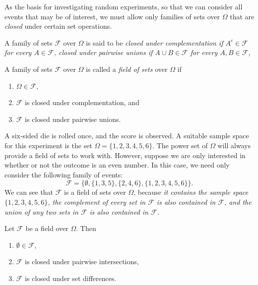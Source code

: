 \smallskip
As the basis for investigating random experiments, so that we can consider all events that may be of interest, we must allow only families of sets over $\Omega$ that are \emph{closed} under certain set operations.

\begin{definition}
A family of sets $\mathcal{F}$ over $\Omega$ is said to be
\ben
\it \emph{closed under complementation} if $A^c\in\mathcal{F}$ for every $A\in\mathcal{F}$, 
\it \emph{closed under pairwise unions} if $A\cup B\in\mathcal{F}$ for every $A,B\in\mathcal{F}$, 
\een
\end{definition}

\begin{definition}
A family of sets $\mathcal{F}$ over $\Omega$ is called a \emph{field of sets} over $\Omega$ if
\begin{enumerate}
\item $\Omega\in\mathcal{F}$,
\item $\mathcal{F}$ is closed under complementation, and
\item $\mathcal{F}$ is closed under pairwise unions.
\end{enumerate}
\end{definition}

\begin{example}\label{ex:fields_of_sets}
A six-sided die is rolled once, and the score is observed. A suitable sample space for this experiment is the set 
$\Omega=\{1,2,3,4,5,6\}$. The power set of $\Omega$ will always provide a field of sets to work with. However, suppose we are only interested in whether or not the outcome is an even number. In this case, we need only consider the following family of events:
\[
\mathcal{F} = \big\{\emptyset, \{1,3,5\}, \{2,4,6\}, \{1,2,3,4,5,6\}\big\}.
\]
We can see that $\mathcal{F}$ is a field of sets over $\Omega$, because
\ben
\it it contains the sample space $\{1,2,3,4,5,6\}$,
\it the complement of every set in $\mathcal{F}$ is also contained in $\mathcal{F}$, and
\it the union of any two sets in $\mathcal{F}$ is also contained in $\mathcal{F}$.
\een
\end{example}

\begin{theorem}
Let $\mathcal{F}$ be a field over $\Omega$. Then
\begin{enumerate}
\item $\emptyset\in\mathcal{F}$,
\item $\mathcal{F}$ is closed under pairwise intersections,
\item $\mathcal{F}$ is closed under set differences.
\end{enumerate}
\end{theorem}

